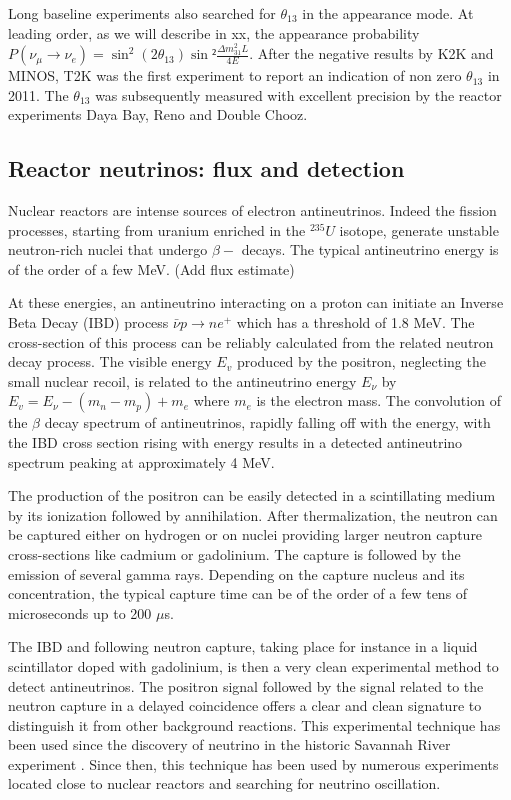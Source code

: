 Long baseline experiments also searched for $\theta_{13}$ in the appearance mode. At leading order, as we will describe in xx, the appearance probability $P(\nu_\mu \rightarrow \nu_e) = \sin^2 (2 \theta_13) \sin² \frac {\Delta m^2_{31} L}{4E}$. After the negative results by K2K and MINOS, T2K was the first experiment to report an indication of non zero $\theta_{13}$ in 2011. The $\theta_{13}$ was subsequently measured with excellent precision by the reactor experiments Daya Bay, Reno and Double Chooz.


\subsection{Reactor neutrinos: flux and detection}
Nuclear reactors are intense sources of electron antineutrinos. Indeed the fission processes, starting from uranium enriched in the $^{235}U$ isotope, generate unstable neutron-rich nuclei that undergo $\beta -$ decays. The typical antineutrino energy is of the order of a few MeV. (Add flux estimate)

At these energies, an antineutrino interacting on a proton can initiate an Inverse Beta Decay (IBD) process $\bar{\nu} p \rightarrow n e^+$ which has a threshold of 1.8 MeV. The cross-section of this process can be reliably calculated from the related neutron decay process. The visible energy $E_v$ produced by the positron, neglecting the small nuclear recoil, is related to the antineutrino energy $E_\nu$ by $E_v =  E_{\nu} -(m_n - m_p) + m_e$ where $m_e$ is the electron mass. The convolution of the $\beta$ decay spectrum of antineutrinos, rapidly falling off with the energy, with the IBD cross section rising with energy results in a detected antineutrino spectrum peaking at approximately 4 MeV. 

The production of the positron can be easily detected in a scintillating medium by its ionization followed by annihilation. After thermalization, the neutron can be captured either on hydrogen or on nuclei providing larger neutron capture cross-sections like cadmium or gadolinium. The capture is followed by the emission of several gamma rays. Depending on the capture nucleus and its concentration, the typical capture time can be of the order of a few tens of microseconds up to 200 $\mu $s.

The IBD and following neutron capture, taking place for instance in a liquid scintillator doped with gadolinium, is then a very clean experimental method to detect antineutrinos. The positron signal followed by the signal related to the neutron capture in a delayed coincidence offers a clear and clean signature to distinguish it from other background reactions. This experimental technique has been used since the discovery of neutrino in the historic Savannah River experiment \cite{reines56}. Since then, this technique has been used by numerous experiments located close to nuclear reactors and searching for neutrino oscillation.

